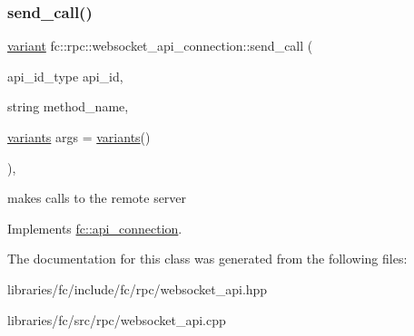 \subsubsection{\texorpdfstring{send\+\_\+call()}{send\_call()}}
{\footnotesize\ttfamily \mbox{\hyperlink{classfc_1_1variant}{variant}} fc\+::rpc\+::websocket\+\_\+api\+\_\+connection\+::send\+\_\+call (\begin{DoxyParamCaption}\item[{api\+\_\+id\+\_\+type}]{api\+\_\+id,  }\item[{string}]{method\+\_\+name,  }\item[{\mbox{\hyperlink{classstd_1_1vector}{variants}}}]{args = {\ttfamily \mbox{\hyperlink{classstd_1_1vector}{variants}}()} }\end{DoxyParamCaption})\hspace{0.3cm}{\ttfamily [override]}, {\ttfamily [virtual]}}

makes calls to the remote server 

Implements \mbox{\hyperlink{classfc_1_1api__connection_a38d046b1803e1242ce10f36c694b9dea}{fc\+::api\+\_\+connection}}.



The documentation for this class was generated from the following files\+:\begin{DoxyCompactItemize}
\item 
libraries/fc/include/fc/rpc/websocket\+\_\+api.\+hpp\item 
libraries/fc/src/rpc/websocket\+\_\+api.\+cpp\end{DoxyCompactItemize}
